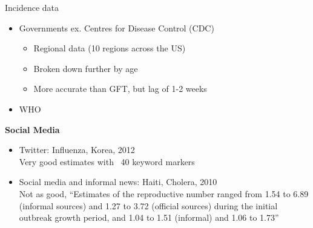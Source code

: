 \documentclass[11pt,compress,aspectratio=1610]{beamer}
\begin{document}
\begin{frame}{Incidence data}
{\begin{itemize}
    \item Governments ex. Centres for Disease Control (CDC)
    \begin{itemize}
        \item Regional data (10 regions across the US)
        \item Broken down further by age
        \item More accurate than GFT, but lag of 1-2 weeks
    \end{itemize}
    \item WHO
\end{itemize}
\textbf{Social Media}
\begin{itemize}
	\item Twitter: Influenza, Korea, 2012 \\
			Very good estimates with ~40 keyword markers
	\item Social media and informal news: Haiti, Cholera, 2010 \\
			Not as good, ``Estimates of the reproductive number ranged from 1.54 to 6.89 (informal sources) and 1.27 to 3.72 (official sources) during the initial outbreak growth period, and 1.04 to 1.51 (informal) and 1.06 to 1.73''
\end{itemize}
}
\end{frame}
\end{document}
